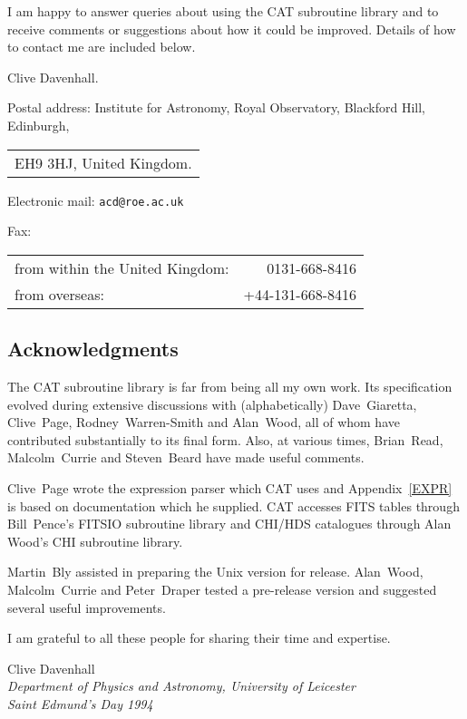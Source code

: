\documentclass[11pt,twoside]{starlink}
\begin{document}
I am happy to answer queries about using the CAT subroutine library
and to receive comments or suggestions about how it could be improved.
Details of how to contact me are included below.

\vspace{2mm}

Clive Davenhall.

\vspace{2mm}

Postal address: Institute for Astronomy, Royal Observatory, Blackford Hill,
Edinburgh, \\
\begin{tabular}{l}
EH9 3HJ, United Kingdom.  \\
\end{tabular}

Electronic mail: \texttt{acd@roe.ac.uk}

Fax: \\
\begin{tabular}{lr}
from within the United Kingdom: &    0131-668-8416 \\
from overseas:                  & +44-131-668-8416 \\
\end{tabular}

\vspace*{\fill}
\stardoccopyright

\newpage
\subsection*{Acknowledgments}

The CAT subroutine library is far from being all my own work. Its
specification evolved during extensive discussions with (alphabetically)
Dave~Giaretta, Clive~Page, Rodney~Warren-Smith and Alan~Wood, all of
whom have contributed substantially to its final form. Also, at various
times, Brian~Read, Malcolm~Currie and Steven~Beard have made useful
comments.

Clive~Page wrote the expression parser which CAT uses and
Appendix~\ref{EXPR} is based on documentation which he supplied. CAT
accesses FITS tables through Bill~Pence's FITSIO subroutine library
and CHI/HDS catalogues through Alan Wood's CHI subroutine library.

Martin~Bly assisted in preparing the Unix version for release.
Alan~Wood, Malcolm~Currie and Peter~Draper tested a pre-release version
and suggested several useful improvements.

I am grateful to all these people for sharing their time and expertise.
\begin{flushright}
Clive Davenhall \\
\latex{\raggedright} \textit{Department of Physics and Astronomy, University of
Leicester \\
Saint Edmund's Day 1994}
\end{flushright}
\end{document}
